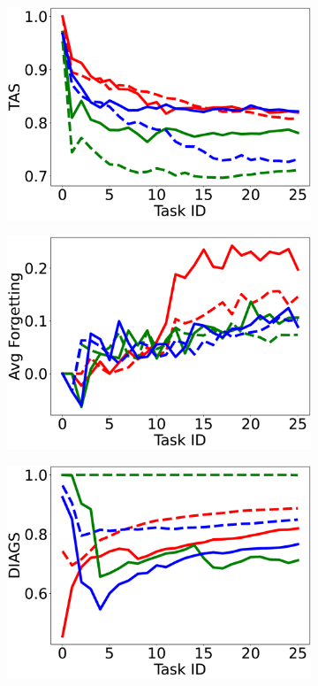 \begin{figure}
\begin{subfigure}{.24\textwidth}
\caption{}
\end{subfigure}
\begin{subfigure}{.24\textwidth}
\includegraphics[width=\textwidth]{imgs/cem/KANDY_2_tas_extended-test.pdf}
\caption{}
\end{subfigure}     
\begin{subfigure}{.24\textwidth}
\includegraphics[width=\textwidth]{imgs/cem/KANDY_2_avg_forgetting-test.pdf}
\caption{}
\end{subfigure}   
\begin{subfigure}{.24\textwidth}
\includegraphics[width=\textwidth]{imgs/cem/KANDY_2_diagonalized_extended-test.pdf}   

\end{subfigure}
\end{figure}
